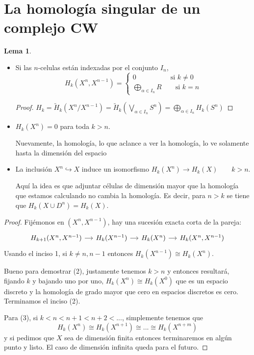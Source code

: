 \documentclass[spanish]{book}
\theoremstyle{definition}
\newtheorem*{lema}{Lema}
\begin{document}
\section{La homología singular de un complejo CW}
	\begin{lema}\leavevmode
	\begin{itemize}
		\item Si las $n$-celulas están indexadas por el conjunto $I_n$, \[H_k(X^n,X^{n-1})=\begin{cases}0\qquad\quad\qquad\text{si }k\neq0\\
			\bigoplus_{\alpha\in I_n}R\qquad \text{si } k=n
		\end{cases}\]
		\begin{proof}
			$H_k=\tilde H_k(X^n/X^{n-1})=\tilde H_k(\bigvee_{\alpha \in I_n}S^n)=\bigoplus_{\alpha\in I_n}H_k(S^n)$
		\end{proof}
		\item $H_k(X^n)=0$ para toda $k>n$. 
		
		Nuevamente, la homología, lo que aclance a ver la homología, lo ve solamente hasta la dimensión del espacio
		\item La inclusión $X^n\hookrightarrow X$ induce un isomorfismo $H_k(X^n)\to H_k(X)\qquad k>n$.
		
		Aquí la idea es que adjuntar células de dimensión mayor que la homología que estamos calculando no cambia la homología. Es decir, para $n>k$ se tiene que $H_k(X\cup D^n)=H_k(X)$.
	\end{itemize}
	\end{lema}
	\begin{proof}
		Fijémonos en $(X^n,X^{n-1})$, hay una sucesión exacta corta de la pareja:
		\[\begin{tikzcd}[column sep=small]
			H_{k+1}(X^n,X^{n-1}) \arrow[r] & H_k(X^{n-1}) \arrow[r] & H_k(X^n) \arrow[r] & H_k(X^n,X^{n-1})
		\end{tikzcd}\]
		Usando el inciso 1, si $k\neq n,n-1$ entonces $H_k(X^{n-1})\cong H_k(X^n)$.
		
		Bueno para demostrar (2), justamente tenemos $k>n$ y entonces resultará, fijando $k$ y bajando uno por uno, $H_k(X^n)\cong H_k(X^0)$ que es un espacio discreto y la homología de grado mayor que cero en espacios discretos es cero. Terminamos el inciso (2).
		
		Para (3), si $k<n<n+1<n+2<...$, simplemente tenemos que
		\[H_k(X^n)\cong H_k(X^{n+1})\cong...\cong H_k(X^{n+m})\]
		y si pedimos que $X$ sea de dimensión finita entonces terminaremos en algún punto y listo. El caso de dimensión infinita queda para el futuro.
	\end{proof}
\end{document}
